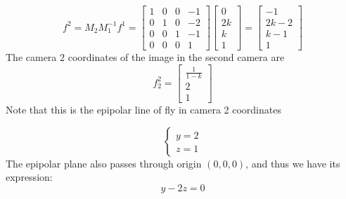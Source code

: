 \documentclass[12pt]{article}
\begin{document}
\begin{equation*}
f^2 = M_2M_1^{-1}f^1 = \left[ \begin{array}{cccc}
1 & 0 & 0 & -1\\
0 & 1 & 0 & -2\\
0 & 0 & 1 & -1\\
0 & 0 & 0 & 1
\end{array} \right] \left[ \begin{array}{c}
0\\
2k\\
k\\
1
\end{array} \right] = \left[ \begin{array}{c}
-1\\
2k-2\\
k-1\\
1
\end{array} \right] 
\end{equation*}
The camera 2 coordinates of the image in the second camera
are 
\begin{equation*}
f_2^2 = \left[ \begin{array}{c}
\frac{1}{1-k}\\
2\\
1
\end{array} \right] 
\end{equation*}
Note that this is the epipolar line of fly in camera 2 coordinates

\begin{equation*}  
\left\{  
     \begin{array}{cc}  
    y = 2\\
    z = 1
     \end{array}  
\right.  
\end{equation*}  
The epipolar plane also passes through origin $(0,0,0)$, and thus we have its expression:
\begin{equation*}  
y-2z = 0
\end{equation*} 
\end{document}
